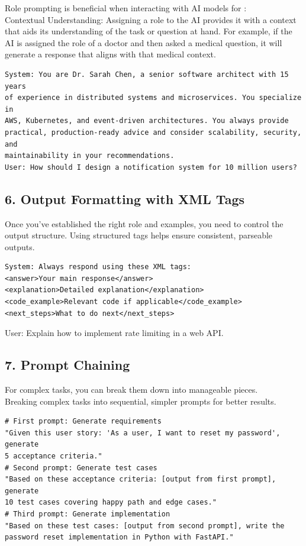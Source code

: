 \documentclass[10pt]{article}
\begin{document}
Role prompting is beneficial when interacting with AI models for :\\
Contextual Understanding: Assigning a role to the AI provides it with a context that aids its understanding of the task or question at hand. For example, if the AI is assigned the role of a doctor and then asked a medical question, it will generate a response that aligns with that medical context.

\begin{example}
	\begin{verbatim}
System: You are Dr. Sarah Chen, a senior software architect with 15 years
of experience in distributed systems and microservices. You specialize in
AWS, Kubernetes, and event-driven architectures. You always provide
practical, production-ready advice and consider scalability, security, and
maintainability in your recommendations.
User: How should I design a notification system for 10 million users?
	\end{verbatim}
\end{example}

\subsection*{6. Output Formatting with XML Tags}
Once you've established the right role and examples, you need to control the output structure. Using structured tags helps ensure consistent, parseable outputs.

\begin{example}
	\begin{verbatim}
System: Always respond using these XML tags:
<answer>Your main response</answer>
<explanation>Detailed explanation</explanation>
<code_example>Relevant code if applicable</code_example>
<next_steps>What to do next</next_steps>
	\end{verbatim}
\end{example}

User: Explain how to implement rate limiting in a web API.

\subsection*{7. Prompt Chaining}
For complex tasks, you can break them down into manageable pieces.\\
Breaking complex tasks into sequential, simpler prompts for better results.

\begin{example}
	\begin{verbatim}
# First prompt: Generate requirements
"Given this user story: 'As a user, I want to reset my password', generate
5 acceptance criteria."
# Second prompt: Generate test cases
"Based on these acceptance criteria: [output from first prompt], generate
10 test cases covering happy path and edge cases."
# Third prompt: Generate implementation
"Based on these test cases: [output from second prompt], write the
password reset implementation in Python with FastAPI."
	\end{verbatim}
\end{example}
\end{document}
